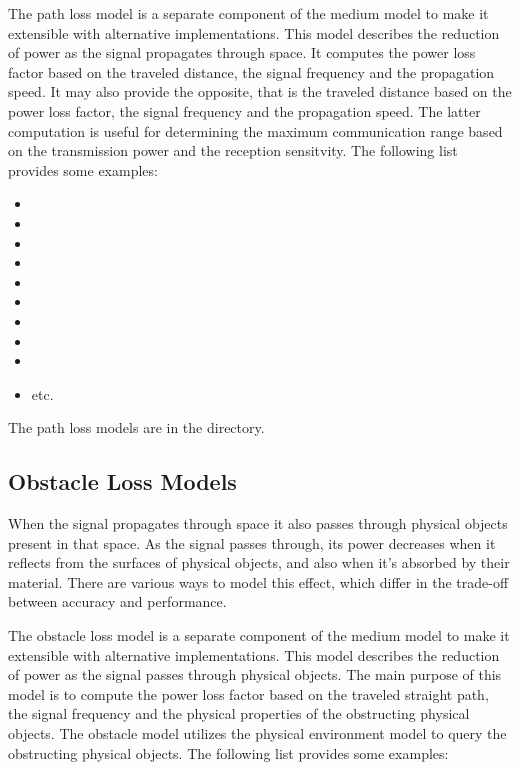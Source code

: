 The path loss model is a separate component of the medium model to make it
extensible with alternative implementations. This model describes the reduction
of power as the signal propagates through space. It computes the power loss
factor based on the traveled distance, the signal frequency and the propagation
speed. It may also provide the opposite, that is the traveled distance based on
the power loss factor, the signal frequency and the propagation speed. The
latter computation is useful for determining the maximum communication range
based on the transmission power and the reception sensitvity. The following list
provides some examples:

\begin{itemize}
  \item {}
  \item {}
  \item {}
  \item {}
  \item {}
  \item {}
  \item {}
  \item {}
  \item {}
  \item etc.
\end{itemize}

The path loss models are in the  directory.

\subsection{Obstacle Loss Models}

When the signal propagates through space it also passes through physical objects
present in that space. As the signal passes through, its power decreases when it
reflects from the surfaces of physical objects, and also when it's absorbed by
their material. There are various ways to model this effect, which differ in the
trade-off between accuracy and performance.

The obstacle loss model is a separate component of the medium model to make it
extensible with alternative implementations. This model describes the reduction
of power as the signal passes through physical objects. The main purpose of this
model is to compute the power loss factor based on the traveled straight path,
the signal frequency and the physical properties of the obstructing physical
objects. The obstacle model utilizes the physical environment model to query the
obstructing physical objects. The following list provides some examples:

